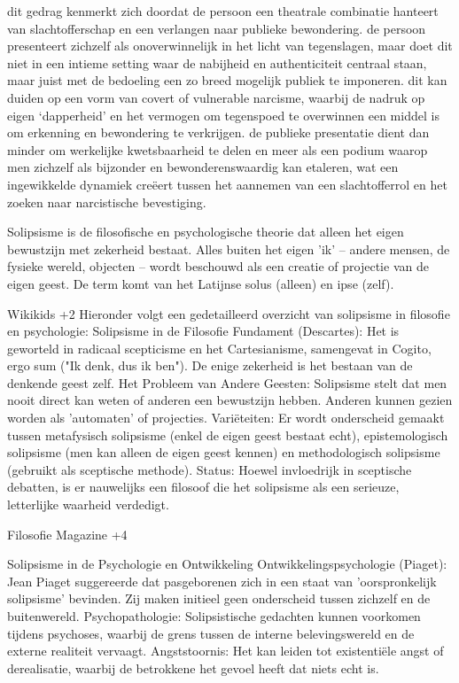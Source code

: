dit gedrag kenmerkt zich doordat de persoon een theatrale combinatie hanteert van slachtofferschap en een verlangen naar publieke bewondering. de persoon presenteert zichzelf als onoverwinnelijk in het licht van tegenslagen, maar doet dit niet in een intieme setting waar de nabijheid en authenticiteit centraal staan, maar juist met de bedoeling een zo breed mogelijk publiek te imponeren. dit kan duiden op een vorm van covert of vulnerable narcisme, waarbij de nadruk op eigen ‘dapperheid’ en het vermogen om tegenspoed te overwinnen een middel is om erkenning en bewondering te verkrijgen. de publieke presentatie dient dan minder om werkelijke kwetsbaarheid te delen en meer als een podium waarop men zichzelf als bijzonder en bewonderenswaardig kan etaleren, wat een ingewikkelde dynamiek creëert tussen het aannemen van een slachtofferrol en het zoeken naar narcistische bevestiging.

Solipsisme is de filosofische en psychologische theorie dat alleen het eigen bewustzijn met zekerheid bestaat. Alles buiten het eigen 'ik' – andere mensen, de fysieke wereld, objecten – wordt beschouwd als een creatie of projectie van de eigen geest. De term komt van het Latijnse solus (alleen) en ipse (zelf).

Wikikids +2
Hieronder volgt een gedetailleerd overzicht van solipsisme in filosofie en psychologie:
Solipsisme in de Filosofie
Fundament (Descartes): Het is geworteld in radicaal scepticisme en het Cartesianisme, samengevat in Cogito, ergo sum ("Ik denk, dus ik ben"). De enige zekerheid is het bestaan van de denkende geest zelf.
Het Probleem van Andere Geesten: Solipsisme stelt dat men nooit direct kan weten of anderen een bewustzijn hebben. Anderen kunnen gezien worden als 'automaten' of projecties.
Variëteiten: Er wordt onderscheid gemaakt tussen metafysisch solipsisme (enkel de eigen geest bestaat echt), epistemologisch solipsisme (men kan alleen de eigen geest kennen) en methodologisch solipsisme (gebruikt als sceptische methode).
Status: Hoewel invloedrijk in sceptische debatten, is er nauwelijks een filosoof die het solipsisme als een serieuze, letterlijke waarheid verdedigt.

Filosofie Magazine +4

Solipsisme in de Psychologie en Ontwikkeling
Ontwikkelingspsychologie (Piaget): Jean Piaget suggereerde dat pasgeborenen zich in een staat van 'oorspronkelijk solipsisme' bevinden. Zij maken initieel geen onderscheid tussen zichzelf en de buitenwereld.
Psychopathologie: Solipsistische gedachten kunnen voorkomen tijdens psychoses, waarbij de grens tussen de interne belevingswereld en de externe realiteit vervaagt.
Angststoornis: Het kan leiden tot existentiële angst of derealisatie, waarbij de betrokkene het gevoel heeft dat niets echt is.

